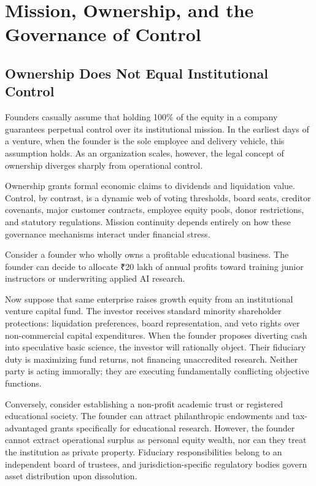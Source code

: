 \section{Mission, Ownership, and the Governance of Control}

\subsection{Ownership Does Not Equal Institutional Control}

Founders casually assume that holding 100\% of the equity in a company guarantees perpetual control over its institutional mission. In the earliest days of a venture, when the founder is the sole employee and delivery vehicle, this assumption holds. As an organization scales, however, the legal concept of ownership diverges sharply from operational control.

Ownership grants formal economic claims to dividends and liquidation value. Control, by contrast, is a dynamic web of voting thresholds, board seats, creditor covenants, major customer contracts, employee equity pools, donor restrictions, and statutory regulations. Mission continuity depends entirely on how these governance mechanisms interact under financial stress.

Consider a founder who wholly owns a profitable educational business. The founder can decide to allocate ₹20 lakh of annual profits toward training junior instructors or underwriting applied AI research.

Now suppose that same enterprise raises growth equity from an institutional venture capital fund. The investor receives standard minority shareholder protections: liquidation preferences, board representation, and veto rights over non-commercial capital expenditures. When the founder proposes diverting cash into speculative basic science, the investor will rationally object. Their fiduciary duty is maximizing fund returns, not financing unaccredited research. Neither party is acting immorally; they are executing fundamentally conflicting objective functions.

Conversely, consider establishing a non-profit academic trust or registered educational society. The founder can attract philanthropic endowments and tax-advantaged grants specifically for educational research. However, the founder cannot extract operational surplus as personal equity wealth, nor can they treat the institution as private property. Fiduciary responsibilities belong to an independent board of trustees, and jurisdiction-specific regulatory bodies govern asset distribution upon dissolution.

